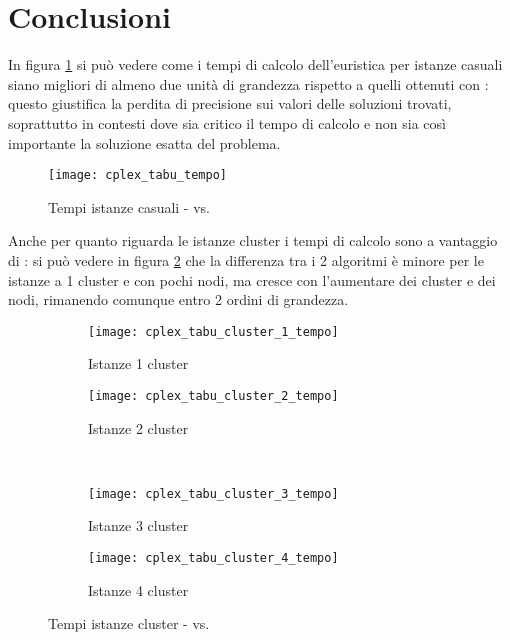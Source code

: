 \section{Conclusioni}

In figura \ref{fig:tempi cplex tabu} si può vedere come i tempi di calcolo dell'euristica \tabu per istanze casuali siano migliori di almeno due unità di grandezza rispetto a quelli ottenuti con : questo giustifica la perdita di precisione sui valori delle soluzioni trovati, soprattutto in contesti dove sia critico il tempo di calcolo e non sia così importante la soluzione esatta del problema.

\begin{figure}[H]
	\centering
	\texttt{[image: cplex\_tabu\_tempo]}
	\caption{Tempi istanze casuali -  vs. \tabu}
	\label{fig:tempi cplex tabu}
\end{figure}

Anche per quanto riguarda le istanze cluster i tempi di calcolo sono a vantaggio di \tabu: si può vedere in figura \ref{fig:tempi cplex tabu cluster} che la differenza tra i 2 algoritmi è minore per le istanze a 1 cluster e con pochi nodi, ma cresce con l'aumentare dei cluster e dei nodi,  rimanendo comunque entro 2 ordini di grandezza.

\begin{figure}[H]
	\centering
	\begin{subfigure}[b]{.45\textwidth}
		\texttt{[image: cplex\_tabu\_cluster\_1\_tempo]}
		\caption{Istanze 1 cluster}
	\end{subfigure}
	\quad
	\begin{subfigure}[b]{.45\textwidth}
		\texttt{[image: cplex\_tabu\_cluster\_2\_tempo]}
		\caption{Istanze 2 cluster}
	\end{subfigure}
	\\
	\begin{subfigure}[b]{.45\textwidth}
		\texttt{[image: cplex\_tabu\_cluster\_3\_tempo]}
		\caption{Istanze 3 cluster}
	\end{subfigure}
	\quad
	\begin{subfigure}[b]{.45\textwidth}
		\texttt{[image: cplex\_tabu\_cluster\_4\_tempo]}
		\caption{Istanze 4 cluster}
	\end{subfigure}
	\caption{Tempi istanze cluster -  vs. \tabu}
	\label{fig:tempi cplex tabu cluster}
\end{figure}


